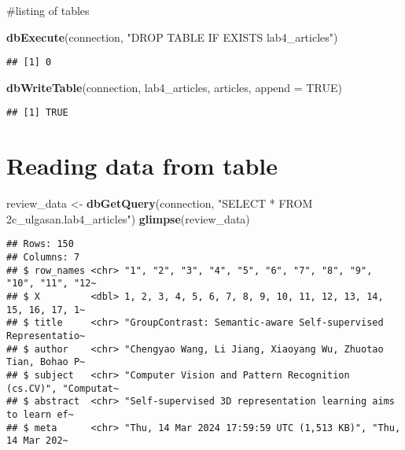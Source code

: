 \documentclass[
]{article}
\newenvironment{Shaded}{\begin{snugshade}}{\end{snugshade}}
\newcommand{\AttributeTok}[1]{\textcolor[rgb]{0.13,0.29,0.53}{#1}}
\newcommand{\ConstantTok}[1]{\textcolor[rgb]{0.56,0.35,0.01}{#1}}
\newcommand{\FunctionTok}[1]{\textcolor[rgb]{0.13,0.29,0.53}{\textbf{#1}}}
\newcommand{\NormalTok}[1]{#1}
\newcommand{\OtherTok}[1]{\textcolor[rgb]{0.56,0.35,0.01}{#1}}
\newcommand{\StringTok}[1]{\textcolor[rgb]{0.31,0.60,0.02}{#1}}
\begin{document}
\#listing of tables

\begin{Shaded}
\begin{Highlighting}[]
\FunctionTok{dbExecute}\NormalTok{(connection, }\StringTok{"DROP TABLE IF EXISTS lab4\_articles"}\NormalTok{)}
\end{Highlighting}
\end{Shaded}

\begin{verbatim}
## [1] 0
\end{verbatim}

\begin{Shaded}
\begin{Highlighting}[]
\FunctionTok{dbWriteTable}\NormalTok{(connection, }\StringTok{\textquotesingle{}lab4\_articles\textquotesingle{}}\NormalTok{, articles, }\AttributeTok{append =} \ConstantTok{TRUE}\NormalTok{)}
\end{Highlighting}
\end{Shaded}

\begin{verbatim}
## [1] TRUE
\end{verbatim}

\hypertarget{reading-data-from-table}{%
\section{Reading data from table}\label{reading-data-from-table}}

\begin{Shaded}
\begin{Highlighting}[]
\NormalTok{review\_data }\OtherTok{\textless{}{-}} \FunctionTok{dbGetQuery}\NormalTok{(connection, }\StringTok{"SELECT * FROM 2c\_ulgasan.lab4\_articles"}\NormalTok{)}
\FunctionTok{glimpse}\NormalTok{(review\_data)}
\end{Highlighting}
\end{Shaded}

\begin{verbatim}
## Rows: 150
## Columns: 7
## $ row_names <chr> "1", "2", "3", "4", "5", "6", "7", "8", "9", "10", "11", "12~
## $ X         <dbl> 1, 2, 3, 4, 5, 6, 7, 8, 9, 10, 11, 12, 13, 14, 15, 16, 17, 1~
## $ title     <chr> "GroupContrast: Semantic-aware Self-supervised Representatio~
## $ author    <chr> "Chengyao Wang, Li Jiang, Xiaoyang Wu, Zhuotao Tian, Bohao P~
## $ subject   <chr> "Computer Vision and Pattern Recognition (cs.CV)", "Computat~
## $ abstract  <chr> "Self-supervised 3D representation learning aims to learn ef~
## $ meta      <chr> "Thu, 14 Mar 2024 17:59:59 UTC (1,513 KB)", "Thu, 14 Mar 202~
\end{verbatim}
\end{document}
